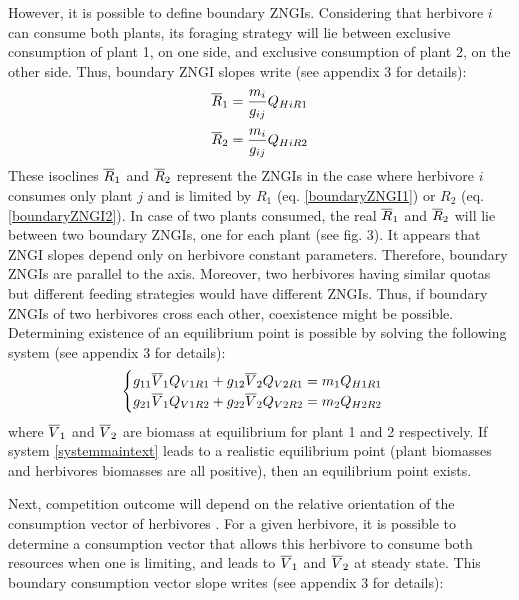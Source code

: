\documentclass[12pt]{article}
\newcommand\barre[1]{\overline{\rule{0pt}{1.5ex}#1}}
\begin{document}
However, it is possible to define boundary ZNGIs. Considering that herbivore $i$ can consume both plants, its foraging strategy will lie between exclusive consumption of plant 1, on one side, and exclusive consumption of plant 2, on the other side. Thus, boundary ZNGI slopes write (see appendix 3 for details):
\begin{equation}\label{boundaryZNGI1}
\barre{R}_1=\frac{m_i}{g_{ij}}Q_{HiR1}
\end{equation}
\begin{equation}\label{boundaryZNGI2}
\barre{R}_2=\frac{m_i}{g_{ij}}Q_{HiR2}
\end{equation}
These isoclines $\barre{R}_1$ and $\barre{R}_2$ represent the ZNGIs in the case where herbivore $i$ consumes only plant $j$ and is limited by $R_1$ (eq. \ref{boundaryZNGI1}) or $R_2$ (eq. \ref{boundaryZNGI2}). In case of two plants consumed, the real $\barre{R}_1$ and $\barre{R}_2$ will lie between two boundary ZNGIs, one for each plant (see fig. 3).
It appears that ZNGI slopes depend only on herbivore constant parameters. Therefore, boundary ZNGIs are parallel to the axis. Moreover, two herbivores having similar quotas but different feeding strategies would have different ZNGIs. Thus, if boundary ZNGIs of two herbivores cross each other, coexistence might be possible. Determining existence of an equilibrium point is possible by solving the following system (see appendix 3 for details):
\begin{equation} \label{systemmaintext}
\begin{cases}
g_{11}\barre{V}_1 Q_{V1R1}+g_{12}\barre{V}_2 Q_{V2R1}=m_1 Q_{H1R1} \\
g_{21}\barre{V}_1 Q_{V1R2}+g_{22}\barre{V}_2 Q_{V2R2}=m_2 Q_{H2R2}
\end{cases} 
\end{equation}
where $\barre{V}_1$ and $\barre{V}_2$ are biomass at equilibrium for plant 1 and 2 respectively. If system \ref{systemmaintext} leads to a realistic equilibrium point (plant biomasses and herbivores biomasses are all positive), then an equilibrium point exists. 
\par
Next, competition outcome will depend on the relative orientation of the consumption vector of herbivores \citep{Tilman1980}. For a given herbivore, it is possible to determine a consumption vector that allows this herbivore to consume both resources when one is limiting, and leads to $\barre{V}_1$ and $\barre{V}_2$ at steady state. This boundary consumption vector slope writes (see appendix 3 for details):
\end{document}
